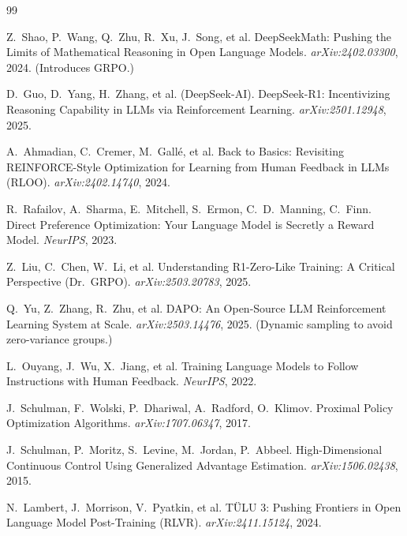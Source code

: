 \documentclass[12pt,a4paper]{report}
\begin{document}
\begin{thebibliography}{99}
\small

Z.~Shao, P.~Wang, Q.~Zhu, R.~Xu, J.~Song, et al.
\newblock DeepSeekMath: Pushing the Limits of Mathematical Reasoning in Open Language Models.
\newblock \emph{arXiv:2402.03300}, 2024. (Introduces GRPO.)

D.~Guo, D.~Yang, H.~Zhang, et al. (DeepSeek-AI).
\newblock DeepSeek-R1: Incentivizing Reasoning Capability in LLMs via Reinforcement Learning.
\newblock \emph{arXiv:2501.12948}, 2025.

A.~Ahmadian, C.~Cremer, M.~Gall\'e, et al.
\newblock Back to Basics: Revisiting REINFORCE-Style Optimization for Learning from Human Feedback in LLMs (RLOO).
\newblock \emph{arXiv:2402.14740}, 2024.

R.~Rafailov, A.~Sharma, E.~Mitchell, S.~Ermon, C.~D.~Manning, C.~Finn.
\newblock Direct Preference Optimization: Your Language Model is Secretly a Reward Model.
\newblock \emph{NeurIPS}, 2023.

Z.~Liu, C.~Chen, W.~Li, et al.
\newblock Understanding R1-Zero-Like Training: A Critical Perspective (Dr.\ GRPO).
\newblock \emph{arXiv:2503.20783}, 2025.

Q.~Yu, Z.~Zhang, R.~Zhu, et al.
\newblock DAPO: An Open-Source LLM Reinforcement Learning System at Scale.
\newblock \emph{arXiv:2503.14476}, 2025. (Dynamic sampling to avoid zero-variance groups.)

L.~Ouyang, J.~Wu, X.~Jiang, et al.
\newblock Training Language Models to Follow Instructions with Human Feedback.
\newblock \emph{NeurIPS}, 2022.

J.~Schulman, F.~Wolski, P.~Dhariwal, A.~Radford, O.~Klimov.
\newblock Proximal Policy Optimization Algorithms.
\newblock \emph{arXiv:1707.06347}, 2017.

J.~Schulman, P.~Moritz, S.~Levine, M.~Jordan, P.~Abbeel.
\newblock High-Dimensional Continuous Control Using Generalized Advantage Estimation.
\newblock \emph{arXiv:1506.02438}, 2015.

N.~Lambert, J.~Morrison, V.~Pyatkin, et al.
\newblock T\"ULU 3: Pushing Frontiers in Open Language Model Post-Training (RLVR).
\newblock \emph{arXiv:2411.15124}, 2024.


\end{thebibliography}
\end{document}
